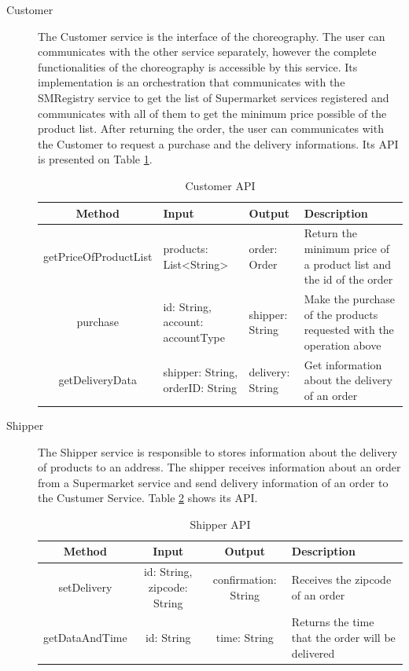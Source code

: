 \begin{description}
\item[Customer] The Customer service is the interface of the choreography. The user can communicates with the other service separately, however the complete functionalities of the choreography is accessible by this service. Its implementation is an orchestration that communicates with the SMRegistry service to get the list of Supermarket services registered and communicates with all of them to get the minimum price possible of the product list. After returning the order, the user can communicates with the Customer to request a purchase and the delivery informations. Its API is presented on Table \ref{customerapi}.
	\begin{table}[htdp]
	\caption{Customer API}
	\begin{center}
	\begin{tabular}{|c|m{3.5cm}|m{3.5cm}|m{4cm}|}
		\hline
		Method				& Input					& Output 					& Description \\ \hline
		getPriceOfProductList	& products: List<String> & order: Order & Return the minimum price of a product list and the id of the order\\ \hline
		purchase 				& id: String, account: accountType & shipper: String & Make the purchase of the products requested with the operation above \\ \hline
		getDeliveryData 		& shipper: String, orderID: String & delivery: String & Get information about the delivery of an order \\ \hline
		
	\end{tabular}
	\end{center}
	\label{customerapi}
	\end{table}%

\item[Shipper] The Shipper service is responsible to stores information about the delivery of products to an address. The shipper receives information about an order from a Supermarket service and send delivery information of an order to the Custumer Service. Table \ref{shipperapi} shows its API.

	\begin{table}[htdp]
	\caption{Shipper API}
	\begin{center}
		\begin{tabular}{|c|c|c|m{4cm}|}
		\hline
		Method			& Input					& Output 					& Description \\ \hline
		setDelivery		& id: String, zipcode: String	& confirmation: String		& Receives the zipcode of an order \\ \hline
		getDataAndTime	& id: String				& time: String				& Returns the time that the order will be delivered \\ \hline
	\end{tabular}
	\end{center}
	\label{shipperapi}
	\end{table}%
	\end{description}
	
